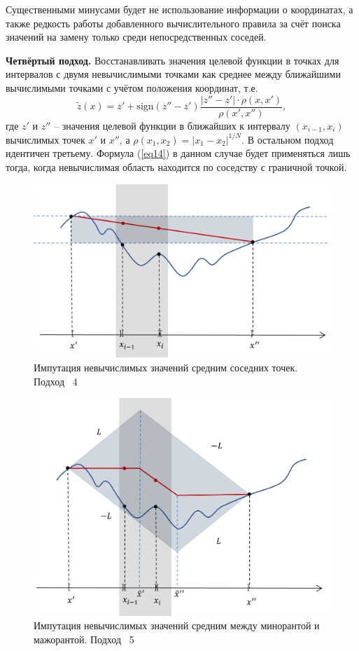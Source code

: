 \documentclass[10pt,a4paper]{book}
\begin{document}
Существенными минусами будет не использование информации о координатах, а также редкость работы добавленного вычислительного правила за счёт поиска значений на замену только среди непосредственных соседей.

\textbf{Четвёртый подход.} Восстанавливать значения целевой функции в точках для интервалов с двумя невычислимыми точками как среднее между ближайшими вычислимыми точками с учётом положения координат, т.е.
\begin{equation}\label{eq17} 
\tilde{z}(x)=z'+ \text{sign}(z''-z') \frac {|z''-z'| \cdot \rho(x,x')}{\rho(x',x'') },
\end{equation}
где $z'$ и $z''$ -- значения целевой функции в ближайших к интервалу $(x_{i-1},x_i)$ вычислимых точек $x'$ и $x''$, а $\rho(x_1,x_2) =  |x_1 - x_2|^{1/N}$. В остальном подход идентичен третьему. Формула (\ref{eq14}) в данном случае будет применяться лишь тогда, когда невычислимая область находится по соседству с граничной точкой.
\begin{figure}
\centering
\includegraphics[width=\textwidth]{pic/fig4.png}
\caption{Импутация невычислимых значений средним соседних точек. Подход \No~4} \label{fig4}
\end{figure}
\begin{figure}
\centering
\includegraphics[width=\textwidth]{pic/fig5.png}
\caption{Импутация невычислимых значений средним между минорантой и мажорантой. Подход \No~5} \label{fig5}
\end{figure}
\end{document}
